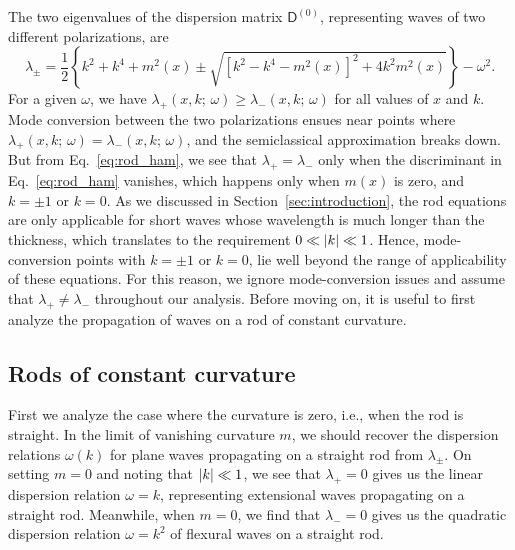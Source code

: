 The two eigenvalues of the dispersion matrix $\mathsf{D}^{(0)}$, representing waves of two different polarizations, are
%
\begin{equation}
  \lambda_{\pm} = \frac{1}{2}\left\{k^{2} + k^{4} + m^{2}(x) \pm \sqrt{\left[k^{2} - k^{4} - m^{2}(x)\right]^{2} + 4k^{2}m^{2}(x)}\right\} - \omega^{2}.
  \label{eq:rod_ham}
\end{equation}
%
For a given $\omega$, we have $\lambda_{+}(x, k;\, \omega) \geq \lambda_{-}(x, k;\, \omega)$ for all values of $x$ and $k$.
Mode conversion between the two polarizations ensues near points where $\lambda_{+}(x, k;\, \omega) = \lambda_{-}(x, k;\, \omega)$, and the semiclassical approximation breaks down.
But from Eq.~\eqref{eq:rod_ham}, we see that $\lambda_{+} = \lambda_{-}$ only when the discriminant in Eq.~\eqref{eq:rod_ham} vanishes, which happens only when $m(x)$ is zero, and $k = \pm 1$ or $k = 0$.
As we discussed in Section~\ref{sec:introduction}, the rod equations are only applicable for short waves whose wavelength is much longer than the thickness, which translates to the requirement $0 \ll \lvert k\rvert \ll 1$.
Hence, mode-conversion points with $k = \pm 1$ or $k = 0$, lie well beyond the range of applicability of these equations.
For this reason, we ignore mode-conversion issues and assume that $\lambda_{+} \neq \lambda_{-}$ throughout our analysis.
Before moving on, it is useful to first analyze the propagation of waves on a rod of constant curvature.

\subsection{Rods of constant curvature}

First we analyze the case where the curvature is zero, i.e., when the rod is straight.
In the limit of vanishing curvature $m$, we should recover the dispersion relations $\omega(k)$ for plane waves propagating on a straight rod from $\lambda_{\pm}$.
On setting $m = 0$ and noting that $\lvert k\rvert \ll 1$, we see that $\lambda_{+} = 0$ gives us the linear dispersion relation $\omega = k$, representing extensional waves propagating on a straight rod.
Meanwhile, when $m = 0$, we find that $\lambda_{-} = 0$ gives us the quadratic dispersion relation $\omega = k^{2}$ of flexural waves on a straight rod.

